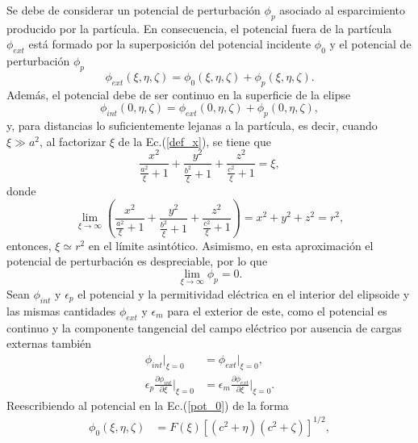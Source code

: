 \noindent Se debe de considerar un potencial de perturbación $\phi_p$ asociado al esparcimiento producido por la partícula. En consecuencia, el potencial fuera de la partícula $\phi_{ext}$ está formado por la superposición del potencial incidente $\phi_0$ y el potencial de perturbación $\phi_p$
\begin{equation}
\phi_{ext}(\xi,\eta,\zeta)=\phi_0(\xi,\eta,\zeta)+\phi_p(\xi,\eta,\zeta).    
\end{equation}
Además, el potencial debe de ser continuo en la superficie de la elipse
\begin{equation}
\phi_{int}(0,\eta,\zeta)=\phi_{ext}(0,\eta,\zeta)+\phi_p(0,\eta,\zeta),    
\end{equation}
y, para distancias lo suficientemente lejanas a la partícula, es decir, cuando $\xi\gg a^2$, al factorizar $\xi$ de  la Ec.(\ref{def_x}), se tiene que 
\begin{equation*}
    \frac{x^2}{\frac{a^2}{\xi}+1}+\frac{y^2}{\frac{b^2}{\xi}+1}+\frac{z^2}{\frac{c^2}{\xi}+1}=\xi,
\end{equation*}
donde
\begin{equation*}
    \lim_{\xi\rightarrow\infty}\left(\frac{x^2}{\frac{a^2}{\xi}+1}+\frac{y^2}{\frac{b^2}{\xi}+1}+\frac{z^2}{\frac{c^2}{\xi}+1}\right)=x^2+y^2+z^2=r^2,
\end{equation*}
entonces, $\xi \simeq r^2$ en el límite asintótico. Asimismo, en esta aproximación el potencial de perturbación es despreciable, por lo que 
\begin{equation}
\lim_{\xi\rightarrow\infty}\phi_p=0
\label{limitephi_p}.
\end{equation}
Sean $\phi_{int}$ y $\epsilon_p$ el potencial y la permitividad eléctrica en el interior del elipsoide y las mismas cantidades $\phi_{ext}$ y $\epsilon_m$ para el exterior de este, como el potencial es continuo y la componente tangencial del campo eléctrico por ausencia de cargas externas también
\begin{subequations}
\label{condicionesfrontera}
\begin{align}
    \phi_{int}|_{\xi=0}&=\phi_{ext}|_{\xi=0}\label{cf1},\\
    \epsilon_p\frac{\partial \phi_{int}}{\partial \xi}\Big |_{\xi=0}&=
    \epsilon_m\frac{\partial \phi_{ext}}{\partial \xi}\Big |_{\xi=0}\label{cf2}.
\end{align}
\end{subequations}
Reescribiendo al potencial en la Ec.(\ref{pot_0}) de la forma
\begin{align}
    \phi_0(\xi,\eta,\zeta)&=F(\xi)[(c^2+\eta)(c^2+\zeta)]^{1/2}
    \label{phi0 con F},
\end{align}
